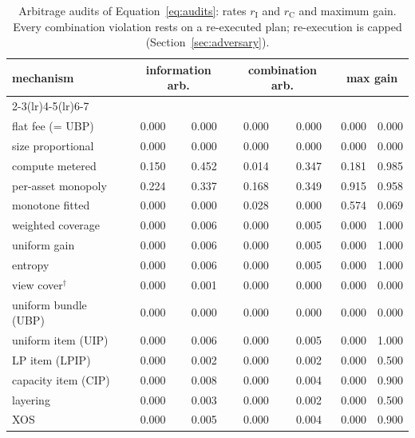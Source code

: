 \begin{table}[t]
  \centering
  \caption{Arbitrage audits of Equation~\eqref{eq:audits}: rates $r_{\mathrm{I}}$ and $r_{\mathrm{C}}$ and maximum gain. Every \sqlshare{} combination violation rests on a re-executed plan; \tpch{} re-execution is capped (Section~\ref{sec:adversary}).}
  \label{tab:audits}
  \begin{tabular}{lcccccc}
    \toprule
    mechanism & \multicolumn{2}{c}{information arb.} & \multicolumn{2}{c}{combination arb.} & \multicolumn{2}{c}{max gain} \\
    \cmidrule(lr){2-3}\cmidrule(lr){4-5}\cmidrule(lr){6-7}
    & \tpch{} & \sqlshare{} & \tpch{} & \sqlshare{} & \tpch{} & \sqlshare{} \\
    \midrule
    flat fee (= UBP) & 0.000 & 0.000 & 0.000 & 0.000 & 0.000 & 0.000 \\
    size proportional & 0.000 & 0.000 & 0.000 & 0.000 & 0.000 & 0.000 \\
    compute metered & 0.150 & 0.452 & 0.014 & 0.347 & 0.181 & 0.985 \\
    per-asset monopoly & 0.224 & 0.337 & 0.168 & 0.349 & 0.915 & 0.958 \\
    monotone fitted & 0.000 & 0.000 & 0.028 & 0.000 & 0.574 & 0.069 \\
    \qirana{} weighted coverage & 0.000 & 0.006 & 0.000 & 0.005 & 0.000 & 1.000 \\
    \qirana{} uniform gain & 0.000 & 0.006 & 0.000 & 0.005 & 0.000 & 1.000 \\
    \qirana{} entropy & 0.000 & 0.006 & 0.000 & 0.005 & 0.000 & 1.000 \\
    \querymarket{} view cover$^{\dagger}$ & 0.000 & 0.001 & 0.000 & 0.000 & 0.000 & 0.000 \\
    uniform bundle (UBP) & 0.000 & 0.000 & 0.000 & 0.000 & 0.000 & 0.000 \\
    uniform item (UIP) & 0.000 & 0.006 & 0.000 & 0.005 & 0.000 & 1.000 \\
    LP item (LPIP) & 0.000 & 0.002 & 0.000 & 0.002 & 0.000 & 0.500 \\
    capacity item (CIP) & 0.000 & 0.008 & 0.000 & 0.004 & 0.000 & 0.900 \\
    layering & 0.000 & 0.003 & 0.000 & 0.002 & 0.000 & 0.500 \\
    XOS & 0.000 & 0.005 & 0.000 & 0.004 & 0.000 & 0.900 \\
    \bottomrule
  \end{tabular}
\end{table}
